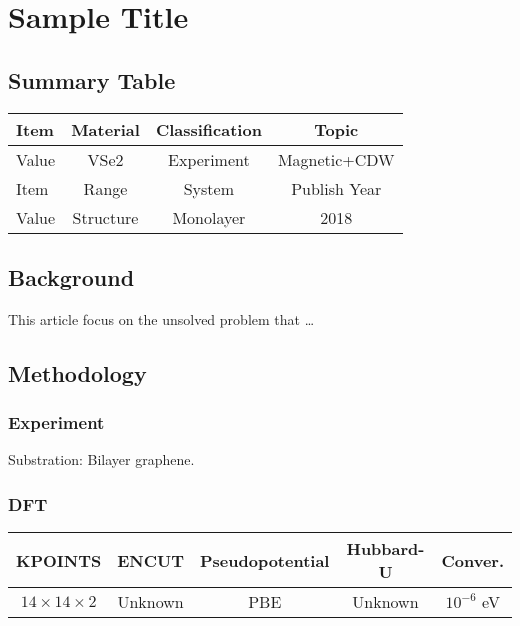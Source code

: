\setchapterpreamble[u]{\margintoc}
\chapter{Sample Title}

\section{Summary Table}

\begin{table}[h]
    \begin{tabular}{lccc}
    \hline
    Item  & Material         & Classification & Topic        \\  \hline
    Value & VSe2             & Experiment     & Magnetic+CDW \\  \hline
    Item  & Range            & System         & Publish Year \\  \hline
    Value & Structure        & Monolayer      & 2018         \\  \hline
    \end{tabular}
\end{table}

\section{Background}
This article focus on the unsolved problem that \dots

\section{Methodology}

\subsection{Experiment}
Substration: Bilayer graphene.

\subsection{DFT}
\begin{table}[h]
    \begin{tabular}{ccccc}
    \toprule
    KPOINTS                 & ENCUT  & Pseudopotential & Hubbard-U & Conver.      \\
    \midrule
    $14 \times 14 \times 2$ & Unknown& PBE             & Unknown   & $10^{-6}$ eV \\
    \bottomrule
    \end{tabular}
\end{table}

